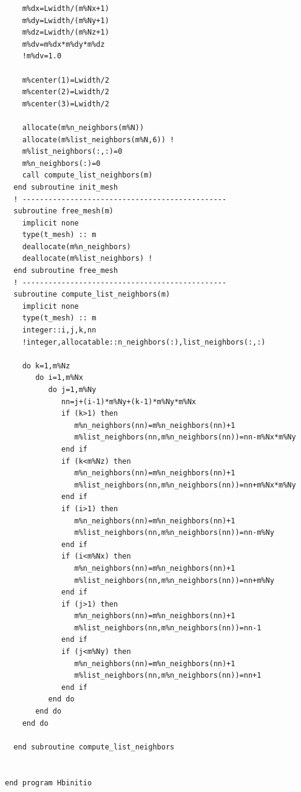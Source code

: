 \documentclass[11pt,a4paper]{article}
\begin{document}
\begin{verbatim}
    m%dx=Lwidth/(m%Nx+1)
    m%dy=Lwidth/(m%Ny+1)
    m%dz=Lwidth/(m%Nz+1)
    m%dv=m%dx*m%dy*m%dz
    !m%dv=1.0

    m%center(1)=Lwidth/2
    m%center(2)=Lwidth/2
    m%center(3)=Lwidth/2
    
    allocate(m%n_neighbors(m%N))
    allocate(m%list_neighbors(m%N,6)) !
    m%list_neighbors(:,:)=0
    m%n_neighbors(:)=0
    call compute_list_neighbors(m)
  end subroutine init_mesh
  ! -----------------------------------------------
  subroutine free_mesh(m)
    implicit none
    type(t_mesh) :: m
    deallocate(m%n_neighbors)
    deallocate(m%list_neighbors) !
  end subroutine free_mesh
  ! -----------------------------------------------
  subroutine compute_list_neighbors(m)
    implicit none
    type(t_mesh) :: m
    integer::i,j,k,nn
    !integer,allocatable::n_neighbors(:),list_neighbors(:,:)
    
    do k=1,m%Nz
       do i=1,m%Nx
          do j=1,m%Ny
             nn=j+(i-1)*m%Ny+(k-1)*m%Ny*m%Nx
             if (k>1) then 
                m%n_neighbors(nn)=m%n_neighbors(nn)+1
                m%list_neighbors(nn,m%n_neighbors(nn))=nn-m%Nx*m%Ny
             end if
             if (k<m%Nz) then 
                m%n_neighbors(nn)=m%n_neighbors(nn)+1
                m%list_neighbors(nn,m%n_neighbors(nn))=nn+m%Nx*m%Ny
             end if
             if (i>1) then 
                m%n_neighbors(nn)=m%n_neighbors(nn)+1
                m%list_neighbors(nn,m%n_neighbors(nn))=nn-m%Ny
             end if
             if (i<m%Nx) then 
                m%n_neighbors(nn)=m%n_neighbors(nn)+1
                m%list_neighbors(nn,m%n_neighbors(nn))=nn+m%Ny
             end if
             if (j>1) then 
                m%n_neighbors(nn)=m%n_neighbors(nn)+1
                m%list_neighbors(nn,m%n_neighbors(nn))=nn-1
             end if
             if (j<m%Ny) then 
                m%n_neighbors(nn)=m%n_neighbors(nn)+1
                m%list_neighbors(nn,m%n_neighbors(nn))=nn+1
             end if
          end do
       end do
    end do

  end subroutine compute_list_neighbors
  
  
end program Hbinitio
\end{verbatim}
\end{document}
